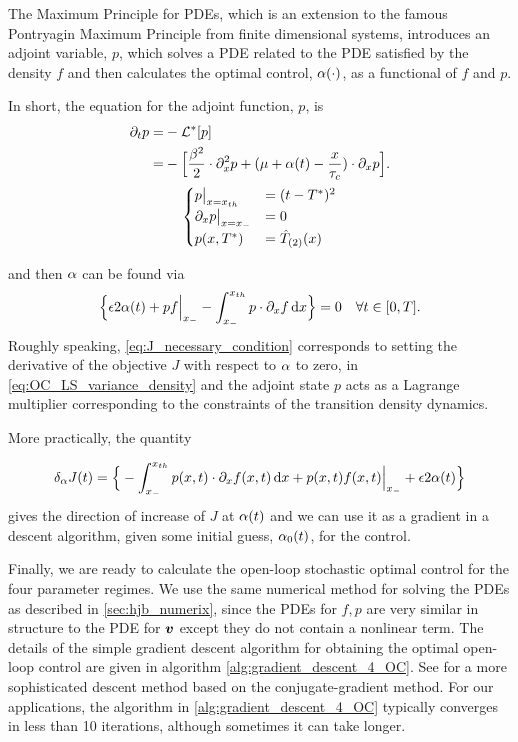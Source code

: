The Maximum Principle for PDEs, which is an extension to the famous Pontryagin
Maximum Principle from finite dimensional systems, introduces an adjoint
variable, $p$, which solves a PDE related to the PDE satisfied by the density
$f$ and then calculates the optimal control, $\alpha(\cdot)$, as a functional of $f$
and $p$.

In short, the equation for the adjoint function, $p$, is
\begin{equation}
\begin{gathered}
\begin{aligned}
{\partial}_t p =& - { { \mathcal{L} }^* }[p]
\\
		=&
			- \Big[ \frac{\beta^2 }{2}\cdot {\partial}^2_x p +
			({\mu } + \alpha(t)- \frac{x}{\tau_c})  \cdot {\partial}_x p \Big].
\end{aligned}
\\
\begin{cases}
	p \big|_{x={ x_{th} }} &= (t-{ T^* })^2
	\\
	{\partial}_x p  \big|_{x={ x_{-} }} &= 0
	\\
	p(x,{ T^* }) &= { \hat{T}_{(2)} }(x)
\end{cases}
\label{eq:adjoint_pde_OU_opt_spike}
\end{gathered}
\end{equation}

and then $\alpha$ can be found via
\begin{equation}
\Big\{
 {\epsilon} 2 \alpha(t)
+ p f \Big|_{ x_{-} }
- \int _{ x_{-} }^{ x_{th} } p \cdot {\partial}_x f \, \mathrm{d} x
\Big\} = 0
\quad \forall t \in [0,T].
\label{eq:J_necessary_condition}
\end{equation}
Roughly speaking, \cref{eq:J_necessary_condition} corresponds to setting the
derivative of the objective $J$  with
respect to $\alpha$ to zero, in \cref{eq:OC_LS_variance_density} and the
adjoint state $p$ acts as a Lagrange multiplier corresponding to the constraints of
the transition density dynamics.

More practically, the quantity

\begin{equation}
\delta_\alpha J (t) =  \Big\{
- \int _{ x_{-} }^{ x_{th} } p(x,t) \cdot {\partial}_x f(x,t) \, \mathrm{d} x
+ p(x,t) f(x,t) \Big|_{ x_{-} }
+ {\epsilon}  2 \alpha(t)
\Big\}
\label{eq:hamiltonian_gradient}
\end{equation}
gives the direction of increase of $J$ at $\alpha(t)$
and we can use it as a gradient in a descent algorithm, given some initial
guess, $\alpha_0(t)$, for the control.

Finally, we are ready to calculate the open-loop stochastic optimal control for
the four parameter regimes. We use the same numerical method for solving the
PDEs as described in \cref{sec:hjb_numerix}, since the PDEs for $f,p$ are very
similar in structure to the PDE for ${ \boldsymbol{v} }$ except they do not contain a nonlinear
term. The details of the simple gradient descent algorithm for obtaining the
optimal open-loop control are given in algorithm
\ref{alg:gradient_descent_4_OC}. See \cite{Annunziato2013} for a more
sophisticated descent method based on the conjugate-gradient method. For our
applications, the algorithm in \ref{alg:gradient_descent_4_OC} typically
converges in less than 10 iterations, although sometimes it can take longer. 

